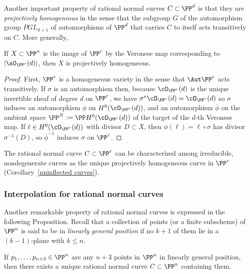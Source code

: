 Another important property of rational normal curves $C \subset \PP^d$ is that they are \emph{projectively homogeneous} in the sense that the subgroup $G$ of the automorphism group $PGL_{d+1}$ of automorphisms of $\PP^d$ that carries $C$ to itself acts transitively on $C$. More generally,

\begin{proposition}\label{Veronese is projectively homogeneous}
If $X\subset \PP^n$ is the image of $\PP^r$ by the Veronese map corresponding to $|\sO_{\PP^r}(d)|$, then $X$ is projectively homogeneous.
\end{proposition}
\begin{proof}
First, $\PP^r$ is a homogeneous variety in the sense that $\Aut \PP^r$ acts transitively. If $\sigma$ is an automorphism then,
 because $\cO_{\PP^r}(d)$ is the unique
invertible sheaf of degree $d$ on $\PP^r$,  we have $\sigma^*\cO_{\PP^r}(d) = \cO_{\PP^r}(d)$ so $\sigma$ induces an automorphism $\phi$ on $H^0(\cO_{\PP^r}(d))$, and an automorphism $\overline \phi$ on the ambient space 
$\PP^{N} := \PP H^0(\cO_{\PP^r}(d))$ of the target of the $d$-th Veronese map. If $\ell \in H^0(\cO_{\PP^r}(d))$
 with divisor $D\subset X$, then $\phi(\ell) = \ell \circ \sigma$ has divisor $\sigma^{-1}(D)$, so $\overline\phi^{-1}$ induces $\sigma$ on $\PP^r$. 
\end{proof}

The rational normal curve $C \subset \PP^r$ can  be characterized among irreducible, nondegenerate curves as the unique projectively homogeneous curve in $\PP^r$ (Corollary~\ref{uninflected curves}).

\subsubsection{Interpolation for rational normal curves}

Another remarkable property of rational normal curves is expressed in the following Proposition. Recall that a collection of points (or a finite subscheme)
of $\PP^n$ is said to be in \emph{linearly general position} if no $k+1$ of them lie in a $(k-1)$-plane with $k\leq n$. 

\begin{proposition}\label{points on rnc}
If $p_1,\dots, p_{n+3} \in \PP^n$ are any $n+3$ points in $\PP^n$ in linearly general position, then there exists a unique rational normal curve $C \subset \PP^n$ containing them.
 \end{proposition}

